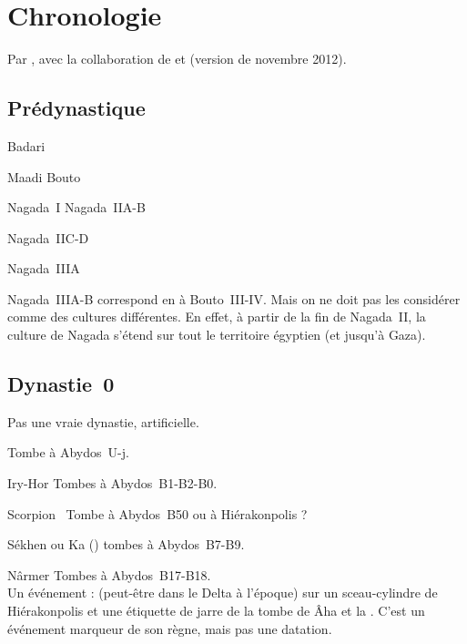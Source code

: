 
\chapter{Chronologie}

Par \DF, avec la collaboration de  et 
 (version de novembre 2012).

\section{Prédynastique}

\begin{listerois}
  \item [\HE Badari \datesregne{4500}{3800}] ~\\
  \item [\BE Maadi Bouto \datation{(environ \anorange{4000}{3400})}]
  \item [\HE Nagada~I Nagada~IIA-B 
         \datation{(environ \anorange{3800}{3600})}]
  \item [\HE Nagada~IIC-D \datation{(environ \anorange{3600}{3300})}]
  \item [\HE Nagada~IIIA \datation{(environ \anorange{3300}{3250})}]
\end{listerois}

Nagada~IIIA-B correspond en \BE à Bouto~III-IV. Mais on ne doit pas 
les considérer comme des cultures différentes. En effet, à partir de 
la fin de Nagada~II, la culture de Nagada s'étend sur tout le 
territoire égyptien (et jusqu'à Gaza).

\section{Dynastie~0}

Pas une vraie dynastie, artificielle.


\begin{listerois}
  \item [\frquote{Scorpion~I}] Tombe à Abydos~U-j.
  \item [Iry-Hor] Tombes à Abydos~B1-B2-B0.
  \item [Scorpion~\frquote{II}] Tombe à Abydos~B50 ou à Hiérakonpolis ?
  \item [Sékhen ou Ka (\nospace{?})] tombes à Abydos~B7-B9.
  \item [Nârmer] Tombes à Abydos~B17-B18. \\
        Un événement :  (peut-être 
        dans le Delta à l'époque) sur un sceau-cylindre de 
        Hiérakonpolis et une étiquette de jarre de la tombe de 
        Âha et la .
        C'est un événement marqueur de son règne, mais pas une 
        datation.
\end{listerois}

